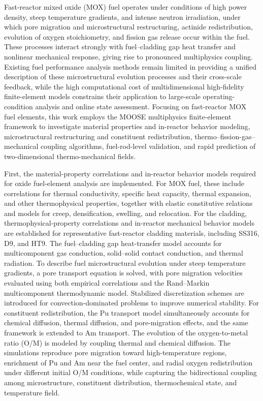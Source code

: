 \begin{englishabstract}
	
	Fast-reactor mixed oxide (MOX) fuel operates under conditions of high power density, steep temperature gradients, and intense neutron irradiation, under which pore migration and microstructural restructuring, actinide redistribution, evolution of oxygen stoichiometry, and fission gas release occur within the fuel. These processes interact strongly with fuel--cladding gap heat transfer and nonlinear mechanical response, giving rise to pronounced multiphysics coupling. Existing fuel performance analysis methods remain limited in providing a unified description of these microstructural evolution processes and their cross-scale feedback, while the high computational cost of multidimensional high-fidelity finite-element models constrains their application to large-scale operating-condition analysis and online state assessment. Focusing on fast-reactor MOX fuel elements, this work employs the MOOSE multiphysics finite-element framework to investigate material properties and in-reactor behavior modeling, microstructural restructuring and constituent redistribution, thermo--fission-gas--mechanical coupling algorithms, fuel-rod-level validation, and rapid prediction of two-dimensional thermo-mechanical fields.
	
	First, the material-property correlations and in-reactor behavior models required for oxide fuel-element analysis are implemented. For MOX fuel, these include correlations for thermal conductivity, specific heat capacity, thermal expansion, and other thermophysical properties, together with elastic constitutive relations and models for creep, densification, swelling, and relocation. For the cladding, thermophysical-property correlations and in-reactor mechanical behavior models are established for representative fast-reactor cladding materials, including SS316, D9, and HT9. The fuel--cladding gap heat-transfer model accounts for multicomponent gas conduction, solid--solid contact conduction, and thermal radiation. To describe fuel microstructural evolution under steep temperature gradients, a pore transport equation is solved, with pore migration velocities evaluated using both empirical correlations and the Rand--Markin multicomponent thermodynamic model. Stabilized discretization schemes are introduced for convection-dominated problems to improve numerical stability. For constituent redistribution, the Pu transport model simultaneously accounts for chemical diffusion, thermal diffusion, and pore-migration effects, and the same framework is extended to Am transport. The evolution of the oxygen-to-metal ratio (O/M) is modeled by coupling thermal and chemical diffusion. The simulations reproduce pore migration toward high-temperature regions, enrichment of Pu and Am near the fuel center, and radial oxygen redistribution under different initial O/M conditions, while capturing the bidirectional coupling among microstructure, constituent distribution, thermochemical state, and temperature field.
	

\end{englishabstract}
